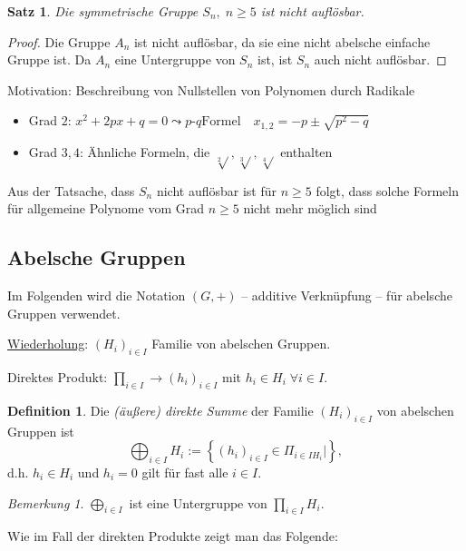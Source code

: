 \documentclass[12pt]{scrartcl} %
\newtheorem{thm}{Satz}
\theoremstyle{definition}
\newtheorem*{defn}{Definition}
\theoremstyle{remark}
\newtheorem*{nb}{Bemerkung}
\begin{document}
\begin{thm}
	Die symmetrische Gruppe $S_n,\;n\geq 5$ ist nicht auflösbar.
\end{thm}

\begin{proof}
	Die Gruppe $A_n$ ist nicht auflösbar, da sie eine nicht abelsche einfache Gruppe ist. Da $A_n$ eine Untergruppe von $S_n$ ist, ist $S_n$ auch nicht auflösbar.
\end{proof}


Motivation: Beschreibung von Nullstellen von Polynomen durch Radikale
\begin{itemize}
  \item Grad $2$: $x^2 + 2px + q = 0 \leadsto p\text{-}q\text{Formel} \quad x_{1,2} = -p \pm \sqrt{p^{2} - q} $
  \item Grad $3,4$: Ähnliche Formeln, die $\sqrt[2]{}, \sqrt[3]{}, \sqrt[4]{}$ enthalten
\end{itemize}

Aus der Tatsache, dass $S_n$ nicht auflösbar ist für $n \geq 5$ folgt, dass solche Formeln für allgemeine Polynome vom Grad $n \geq 5$ nicht mehr möglich sind

\subsection{Abelsche Gruppen}

Im Folgenden wird die Notation $(G,+)$ -- additive Verknüpfung -- für abelsche Gruppen verwendet.

\underline{Wiederholung}: $(H_i)_{i \in I}$ Familie von abelschen Gruppen.

Direktes Produkt: $\prod_{i \in I} \to (h_i)_{i \in I}$ mit $h_i \in H_i \; \forall i \in I$.

\begin{defn}
  Die \emph{(äußere) direkte Summe} der Familie $(H_i)_{i \in I}$ von abelschen Gruppen ist 
  \[ \bigoplus_{i \in I} H_i := \left\{ (h_i)_{i \in I} \in \Pi_{i \in I H_i} |  \right\}, \]
  d.h. $h_i \in H_i$ und $h_i = 0$ gilt für fast alle $i \in I$.
\end{defn}

\begin{nb}
  $\bigoplus_{i \in I}$ ist eine Untergruppe von $\prod_{i \in I} H_i$.
\end{nb}

Wie im Fall der direkten Produkte zeigt man das Folgende:
\end{document}
